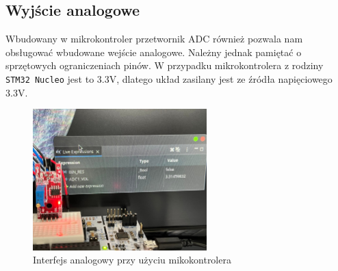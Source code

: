 \documentclass[11pt, a4paper]{article}
\begin{document}
\subsection{Wyjście analogowe}
Wbudowany w mikrokontroler przetwornik ADC również pozwala nam obsługować wbudowane wejście analogowe. Należny jednak pamiętać o sprzętowych ograniczeniach pinów. W przypadku mikrokontrolera z rodziny \texttt{STM32 Nucleo} jest to 3.3V, dlatego układ zasilany jest ze źródła napięciowego 3.3V.

\begin{figure}[h!]
    \centering
    \includegraphics[width=0.6\textwidth]{fig/KY-036/284656287_1051707678886130_4346124543266946166_n}
    \caption{Interfejs analogowy przy użyciu mikokontrolera}
    \label{fig:my_label}
\end{figure}


\newpage
\end{document}
